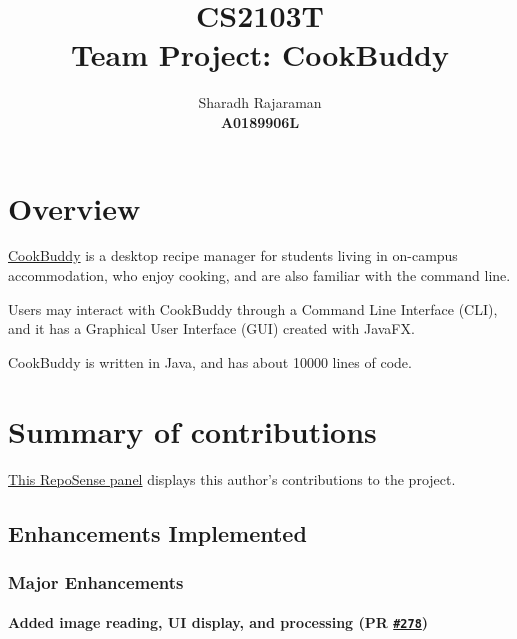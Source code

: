 \documentclass[11pt,british]{article}
\title{\vspace{-2.5cm} \textbf{CS2103T} \\ Team Project: CookBuddy}
\author{Sharadh Rajaraman \\ \textbf{A0189906L}}
\begin{document}
\maketitle
\section{Overview}\label{overview}
\href{https://github.com/AY1920S2-CS2103T-W12-4/main}{CookBuddy} is a desktop recipe manager for students living in on-campus accommodation, who enjoy cooking, and are also familiar with the command line.

Users may interact with CookBuddy through a Command Line Interface (CLI), and it has a Graphical User Interface (GUI) created with JavaFX.

CookBuddy is written in Java, and has about \num{10000} lines of code.

\section{Summary of contributions}\label{summaryofcontributions}
\href{https://nus-cs2103-ay1920s2.github.io/tp-dashboard/#search=W12&sort=groupTitle&sortWithin=title&since=2020-02-14&timeframe=commit&mergegroup=false&groupSelect=groupByRepos&breakdown=false&tabOpen=true&tabType=authorship&tabAuthor=sharadhr&tabRepo=AY1920S2-CS2103T-W12-4\%2Fmain\%5Bmaster\%5D}{This RepoSense panel} displays this author's contributions to the project.

\subsection{Enhancements Implemented}
\subsubsection{Major Enhancements}

\paragraph{Added image reading, UI display, and processing (PR \href{https://github.com/AY1920S2-CS2103T-W12-4/main/pull/278}{\texttt{\#278}})}\label{imgcontrib}
\end{document}
